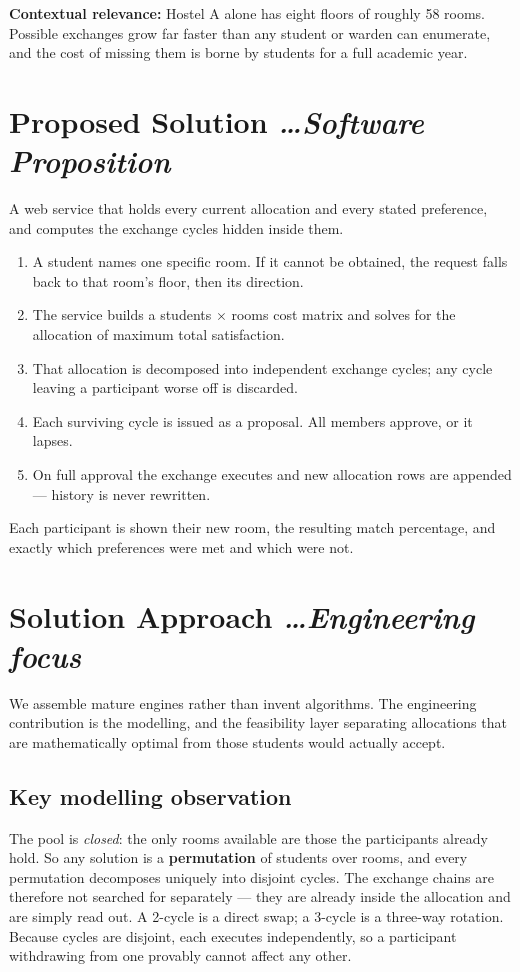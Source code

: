\documentclass[11pt,a4paper]{article}
\newcommand{\BvrHint}[1]{%
  {\normalfont\normalsize\itshape\hfill #1}}
\begin{document}
\textbf{Contextual relevance:} Hostel A alone has eight
floors of roughly 58 rooms. Possible exchanges grow far
faster than any student or warden can enumerate, and the
cost of missing them is borne by students for a full
academic year.

\section{Proposed Solution %
\BvrHint{\ldots Software Proposition}}
A web service that holds every current allocation and
every stated preference, and computes the exchange
cycles hidden inside them.
\begin{enumerate}[leftmargin=0.7cm]
    \item A student names one specific room. If it
      cannot be obtained, the request falls back to that
      room's floor, then its direction.
    \item The service builds a students $\times$ rooms
      cost matrix and solves for the allocation of
      maximum total satisfaction.
    \item That allocation is decomposed into independent
      exchange cycles; any cycle leaving a participant
      worse off is discarded.
    \item Each surviving cycle is issued as a proposal.
      All members approve, or it lapses.
    \item On full approval the exchange executes and new
      allocation rows are appended --- history is never
      rewritten.
\end{enumerate}
Each participant is shown their new room, the resulting
match percentage, and exactly which preferences were met
and which were not.

\section{Solution Approach %
\BvrHint{\ldots Engineering focus}}
We assemble mature engines rather than invent
algorithms. The engineering contribution is the
modelling, and the feasibility layer separating
allocations that are mathematically optimal from those
students would actually accept.

\subsection{Key modelling observation}
The pool is \emph{closed}: the only rooms available are
those the participants already hold. So any solution is
a \textbf{permutation} of students over rooms, and every
permutation decomposes uniquely into disjoint cycles.
The exchange chains are therefore not searched for
separately --- they are already inside the allocation and
are simply read out. A 2-cycle is a direct swap; a
3-cycle is a three-way rotation. Because cycles are
disjoint, each executes independently, so a participant
withdrawing from one provably cannot affect any other.
\end{document}
